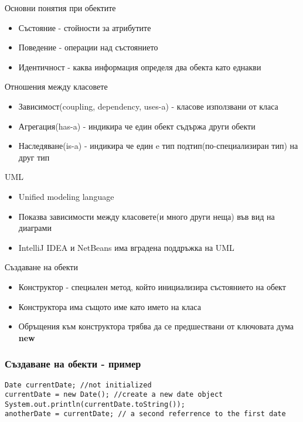\documentclass{beamer}
\begin{document}
\begin{frame}{Основни понятия при обектите}
  \transdissolve
  \begin{itemize}
  \item Състояние - стойности за атрибутите
  \item Поведение - операции над състоянието
  \item Идентичност - каква информация определя два обекта като
    еднакви 
  \end{itemize}
\end{frame}

\begin{frame}{Отношения между класовете}
  \transdissolve
  \begin{itemize}
  \item Зависимост(coupling, dependency, uses-a) - класове използвани от класа
  \item Агрегация(has-a) - индикира че един обект съдържа други обекти
  \item Наследяване(is-a) - индикира че един e  тип подтип(по-специализиран тип) на друг тип
  \end{itemize}
\end{frame}

\begin{frame}{UML}
  \transdissolve
  \begin{itemize}
  \item Unified modeling language
  \item Показва зависимости между класовете(и
    много други неща) във вид на диаграми
  \item IntelliJ IDEA и NetBeans има вградена поддръжка на UML
  \end{itemize}
\end{frame}

\begin{frame}{Създаване на обекти}
  \transdissolve
  \begin{itemize}
  \item Конструктор -  специален метод, който
    инициализира състоянието на обект
   \item Конструктора има същото име като
    името на класа
    \item Обръщения към конструктора трябва да
    се предшествани от ключовата дума
    \textbf{new}
  \end{itemize}
\end{frame}

\begin{frame}[fragile]
  \frametitle{Създаване на обекти - пример}
  \transdissolve
\begin{lstlisting}
Date currentDate; //not initialized
currentDate = new Date(); //create a new date object
System.out.println(currentDate.toString());
anotherDate = currentDate; // a second referrence to the first date
\end{lstlisting}
\end{frame}
\end{document}
